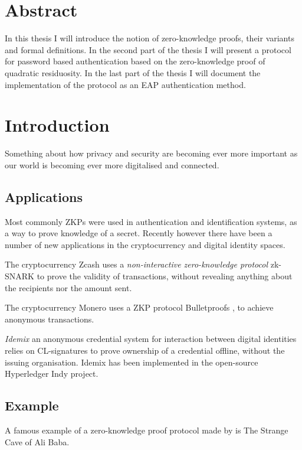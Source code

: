 \section{Abstract}
In this thesis I will introduce the notion of zero-knowledge proofs, their variants and formal definitions.
In the second part of the thesis I will present a protocol for password based authentication based on the zero-knowledge proof of quadratic residuosity.
In the last part of the thesis I will document the implementation of the protocol as an EAP authentication method. %

\newpage

\section{Introduction}
Something about how privacy and security are becoming ever more important as our world is becoming ever more digitalised and connected. %

\subsection{Applications}
Most commonly ZKPs were used in authentication and identification systems, as a way to prove knowledge of a secret. 
Recently however there have been a number of new applications in the cryptocurrency and digital identity spaces.

The cryptocurrency Zcash uses a \textit{non-interactive zero-knowledge protocol} zk-SNARK \cite{bowe2018multi} to prove the validity of transactions, without revealing anything about the recipients nor the amount sent.

The cryptocurrency Monero uses a ZKP protocol Bulletproofs \cite{bunz2018bulletproofs}, to achieve anonymous transactions.

\textit{Idemix} \cite{camenisch2002design} an anonymous credential system for interaction between digital identities relies on CL-signatures \cite{camenisch2001efficient} to prove ownership of a credential offline, without the issuing organisation.
Idemix has been implemented in the open-source Hyperledger Indy project.

\subsection{Example}
A famous example of a zero-knowledge proof protocol made by \cite{QJM} is The Strange Cave of Ali Baba.

